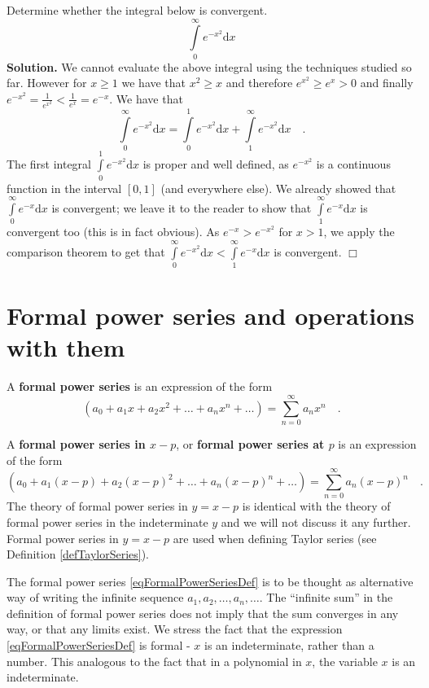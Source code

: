 \documentclass[12pt]{book}
\newcommand{\diff}{\text{d}}
\newenvironment{solution}{\textbf{Solution.} }{$\Box$}
\renewcommand{\emph}{\textbf}
\begin{document}
Determine whether the integral below is convergent. 
\[
\int\limits_{0}^{\infty}e^{-x^2}\diff x
\]
\begin{solution}
We cannot evaluate the above integral using the techniques studied so far. However  for $x\geq 1$ we have that $x^2\geq x$ and therefore $e^{x^2}\geq e^{x}>0$ and finally $e^{-x^2}= \frac{1}{e^{x^2}}<\frac{1}{e^x}= e^{-x}$. We have that 
\[
\int\limits_{0}^{\infty}e^{-x^2}\diff x= \int\limits_{0}^{1}e^{-x^2}\diff x +\int\limits_{1}^{\infty}e^{-x^2}\diff x\quad .
\]
The first integral $\int\limits_{0}^{1}e^{-x^2}\diff x$ is proper and well defined, as $e^{-x^2}$ is a continuous function in the interval $[0,1]$ (and everywhere else).  We already showed that $ \int\limits_{0}^{\infty}e^{-x}\diff x$ is convergent; we leave it to the reader to show that $ \int\limits_{1}^{\infty}e^{-x}\diff x$ is convergent too (this is in fact obvious). As $e^{-x}>e^{-x^2}$ for $x>1$, we apply the comparison theorem to get that $\int\limits_{0}^{\infty}e^{-x^2}\diff x<\int\limits_{1}^{\infty}e^{-x}\diff x$ is convergent.
\end{solution}

\section{Formal power series and operations with them} \label{secFormalPowerSeries}
 A \emph{formal power series} is an expression of the form 
\begin{equation}\label{eqFormalPowerSeriesDef}
(a_0 + a_1x+a_2x^2+\dots +a_nx^n+\dots)= \sum_{n=0}^{\infty} a_n x^n \quad .
\end{equation}

 A \emph{formal power series in $x-p$}, or \emph{formal power series at $p$} is an expression of the form 
\begin{equation}\label{eqFormalPowerAtPSeriesDef}
(a_0 + a_1(x-p)+a_2(x-p)^2+\dots +a_n(x-p)^n+\dots)= \sum_{n=0}^{\infty} a_n (x-p)^n \quad .
\end{equation}
The theory of formal power series in $y=x-p$ is identical with the theory of formal power series in the indeterminate $y$ and we will not discuss it any further. Formal power series in $y=x-p$ are used when defining Taylor series (see Definition \ref{defTaylorSeries}).

The formal power series \eqref{eqFormalPowerSeriesDef} is to be thought as alternative way of writing the infinite sequence $a_1, a_2, \dots, a_n,\dots $. The ``infinite sum'' in the definition of formal power series does not imply that the sum converges in any way, or that any limits exist. We stress the fact that the expression  \eqref{eqFormalPowerSeriesDef} is  formal - $x$  is an indeterminate, rather than a number. This analogous to the fact that in a polynomial in $x$, the variable $x$ is an indeterminate.
\end{document}
